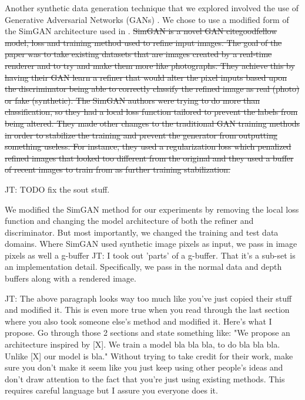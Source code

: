 \documentclass[10pt,twocolumn,letterpaper]{article}
\newcommand{\tompson}[1]{{\color{green} JT: #1}}
\begin{document}
Another synthetic data generation technique that we explored involved the use of Generative Adversarial Networks (GANs) \cite{2014arXiv1409.7495G}.  We chose to use a modified form of the SimGAN architecture used in \cite{DBLP:journals/corr/ShrivastavaPTSW16}.   \sout{SimGAN is a novel GAN citegoodfellow model, loss and training method used to refine input images.  The goal of the paper was to take existing datasets that are images created by a real-time renderer and to try and make them more like photographs. They achieve this by having their GAN learn a refiner that would alter the pixel inputs based upon the discriminator being able to correctly classify the refined image as real (photo) or fake (synthetic).  The SimGAN authors were trying to do more than classification, so they had a local loss function tailored to prevent the labels from being altered.  They made other changes to the traditional GAN training methods in order to stabilize the training and prevent the generator from outputting something useless.  For instance, they used a regularization loss which penalized refined images that looked too different from the original and they used a buffer of recent images to train from as further training stabilization.}

\tompson{TODO fix the sout stuff.}

We modified the SimGAN method for our experiments by removing the local loss function and changing the model architecture of both the refiner and discriminator.  But most importantly, we changed the training and test data domains.  Where SimGAN used synthetic image pixels as input, we pass in image pixels as well a g-buffer \tompson{I took out 'parts' of a g-buffer. That it's a sub-set is an implementation detail}. Specifically, we pass in the normal data and depth buffers along with a rendered image.  

\tompson{The above paragraph looks way too much like you've just copied their stuff and modified it. This is even more true when you read through the last section where you also took someone else's method and modified it. Here's what I propose. Go through those 2 sections and state something like: "We propose an architecture inspired by [X]. We train a model bla bla bla, to do bla bla bla. Unlike [X] our model is bla." Without trying to take credit for their work, make sure you don't make it seem like you just keep using other people's ideas and don't draw attention to the fact that you're just using existing methods. This requires careful language but I assure you everyone does it.}
\end{document}
